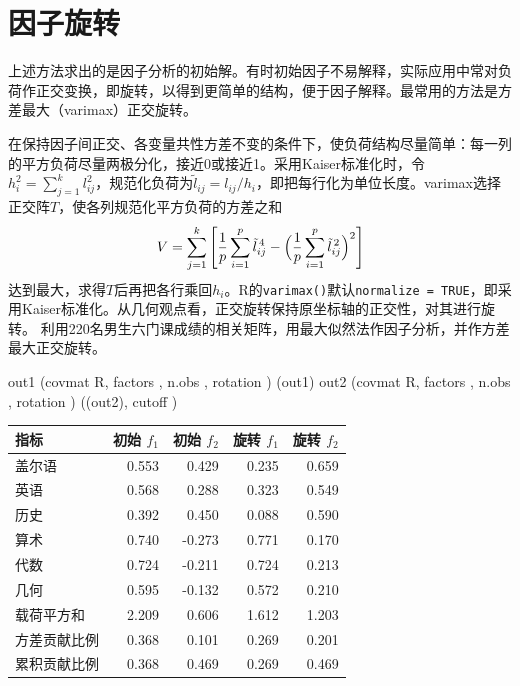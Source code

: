 \section{因子旋转}\label{sec:rotation}
上述方法求出的是因子分析的初始解。有时初始因子不易解释，实际应用中常对负荷作正交变换，即旋转，以得到更简单的结构，便于因子解释。最常用的方法是方差最大（varimax）正交旋转。

在保持因子间正交、各变量共性方差不变的条件下，使负荷结构尽量简单：每一列的平方负荷尽量两极分化，接近0或接近1。采用Kaiser标准化时，令$h_i^2=\sum_{j=1}^kl_{ij}^2$，规范化负荷为$\tilde l_{ij}=l_{ij}/h_i$，即把每行化为单位长度。varimax选择正交阵$T$，使各列规范化平方负荷的方差之和
\[
V=\sum_{j=1}^k\left[\frac1p\sum_{i=1}^p\tilde l_{ij}^{\,4}-\Bigl(\frac1p\sum_{i=1}^p\tilde l_{ij}^{\,2}\Bigr)^2\right]
\]
达到最大，求得$T$后再把各行乘回$h_i$。R的\texttt{varimax()}默认\texttt{normalize = TRUE}，即采用Kaiser标准化。从几何观点看，正交旋转保持原坐标轴的正交性，对其进行旋转。
利用220名男生六门课成绩的相关矩阵，用最大似然法作因子分析，并作方差最大正交旋转。
\begin{code}
out1 \ROperator{<-} (covmat \ROperator{=} R, factors \ROperator{=} , n.obs \ROperator{=} , rotation \ROperator{=} )
(out1)
out2 \ROperator{<-} (covmat \ROperator{=} R, factors \ROperator{=} , n.obs \ROperator{=} , rotation \ROperator{=} )
((out2), cutoff \ROperator{=} )   
\end{code}
\par\addvspace{5pt}\begin{center}\begin{minipage}{\linewidth}\centering
\small
{}\label{tab:rot}
\begin{tabular}{lrrrr}\toprule
{\bfseries 指标 }&{\bfseries  初始 $f_1$ }&{\bfseries  初始 $f_2$ }&{\bfseries  旋转 $f_1$ }&{\bfseries  旋转 $f_2$}\\\midrule
盖尔语 & 0.553 & 0.429 & 0.235 & 0.659\\
英语 & 0.568 & 0.288 & 0.323 & 0.549\\
历史 & 0.392 & 0.450 & 0.088 & 0.590\\
算术 & 0.740 & -0.273 & 0.771 & 0.170\\
代数 & 0.724 & -0.211 & 0.724 & 0.213\\
几何 & 0.595 & -0.132 & 0.572 & 0.210\\
载荷平方和 & 2.209 & 0.606 & 1.612 & 1.203\\
方差贡献比例 & 0.368 & 0.101 & 0.269 & 0.201\\
累积贡献比例 & 0.368 & 0.469 & 0.269 & 0.469\\
\bottomrule\end{tabular}
\end{minipage}\end{center}

